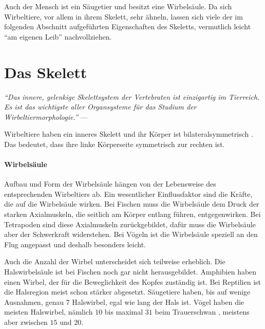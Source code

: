 Auch der Mensch ist ein Säugetier und besitzt eine Wirbelsäule. Da sich Wirbeltiere, vor allem in ihrem Skelett, sehr ähneln, lassen sich viele der im folgenden Abschnitt aufgeführten Eigenschaften des Skeletts, vermutlich leicht "`am eigenen Leib"' nachvollziehen.


\newpage
\section{Das Skelett}
\label{biology_skeleton}

\vspace{0.5cm}
\begin{center}
 \begin{minipage}{12cm}
  \emph{"`Das innere, gelenkige Skelettsystem der Vertebraten ist einzigartig im Tierreich. Es ist das wichtigste aller Organsysteme für das Studium der Wirbeltiermorphologie."'}
  --- \cite[S.\ 131]{Vergleichende_Anatomie}
 \end{minipage}
\end{center}


Wirbeltiere haben ein inneres Skelett und ihr Körper ist bilateralsymmetrisch \cite[S.\ 27]{Vergleichende_Anatomie}. Das bedeutet, dass ihre linke Körperseite symmetrisch zur rechten ist. 

\paragraph{Wirbelsäule}
Aufbau und Form der Wirbelsäule hängen von der Lebensweise des entsprechenden Wirbeltiers ab. Ein wesentlicher Einflussfaktor sind die Kräfte, die auf die Wirbelsäule wirken. 
Bei Fischen muss die Wirbelsäule dem Druck der starken Axialmuskeln, die seitlich am Körper entlang führen, entgegenwirken.
Bei Tetrapoden sind diese Axialmuskeln zurückgebildet, dafür muss die Wirbelsäule aber der Schwerkraft widerstehen.
Bei Vögeln ist die Wirbelsäule speziell an den Flug angepasst und deshalb \ua besonders leicht.\\
\cite[\mbox{Abschnitt 9.2}, S.\ 168 ff.]{Vergleichende_Anatomie}

Auch die Anzahl der Wirbel unterscheidet sich teilweise erheblich. 
Die Halswirbelsäule ist \zb bei Fischen noch gar nicht herausgebildet. Amphibien haben einen Wirbel, der für die Beweglichkeit des Kopfes zuständig ist. Bei Reptilien ist die Halsregion meist schon stärker abgesetzt. Säugetiere haben, bis auf wenige Ausnahmen, genau $7$ Halswirbel, egal wie lang der Hals ist. Vögel haben die meisten Halswirbel, nämlich $10$ bis maximal $31$ beim Trauerschwan \cite{WikipediaVogelskelett}, meistens aber zwischen $15$ und $20$. \cite[Abschnitt 9.2]{Vergleichende_Anatomie}

